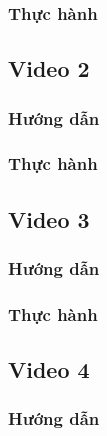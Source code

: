 \documentclass{article}
\begin{document}
  



\subsubsection{Thực hành}



\subsection{Video 2}
\subsubsection{Hướng dẫn}

\subsubsection{Thực hành}




\subsection{Video 3}
\subsubsection{Hướng dẫn}

\subsubsection{Thực hành}




\subsection{Video 4}
\subsubsection{Hướng dẫn}
\end{document}
